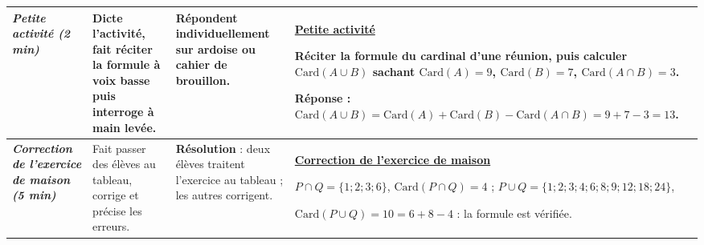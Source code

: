 \documentclass[10pt]{article}
\newcommand{\titreR}[1]{\underline{\textcolor{rougetitre}{\bfseries #1}}}
\newcommand{\seance}[1]{\fcolorbox{bleuseance}{bleufond}{\textcolor{bleuseance}{\bfseries #1}}}
\newcommand{\moment}[1]{\textbf{\itshape #1}}
\begin{document}
\begin{longtable}{|p{2.35cm}|p{5.35cm}|p{4.55cm}|p{13.85cm}|}
\hline
\seance{SEANCE 3} \newline \moment{Petite activité (2 min)} &
Dicte l'activité, fait réciter la formule à voix basse puis interroge à main levée. &
Répondent individuellement sur ardoise ou cahier de brouillon. &
\titreR{Petite activité} \par
Réciter la formule du cardinal d'une réunion, puis calculer
$\mathrm{Card}(A\cup B)$ sachant $\mathrm{Card}(A)=9$, $\mathrm{Card}(B)=7$,
$\mathrm{Card}(A\cap B)=3$. \par
\textbf{Réponse :} $\mathrm{Card}(A\cup B)=\mathrm{Card}(A)+\mathrm{Card}(B)
-\mathrm{Card}(A\cap B)=9+7-3=13$. \\ \hline

\moment{Correction de l'exercice de maison (5 min)} &
Fait passer des élèves au tableau, corrige et précise les erreurs. &
\textbf{Résolution} : deux élèves traitent l'exercice au tableau ; les autres corrigent. &
\titreR{Correction de l'exercice de maison} \par
$P\cap Q=\{1;2;3;6\}$, $\mathrm{Card}(P\cap Q)=4$ ; \;
$P\cup Q=\{1;2;3;4;6;8;9;12;18;24\}$, \par
$\mathrm{Card}(P\cup Q)=10=6+8-4$ : la formule est vérifiée. \\ \hline


\end{longtable}
\end{document}
